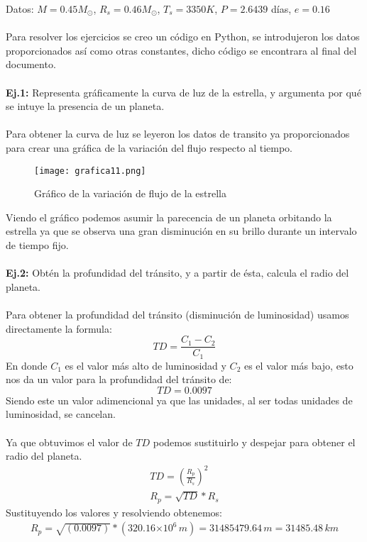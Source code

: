 \documentclass[12pt,letterpaper]{article}
\newcommand\tenpow[1]{\ensuremath{{\times}10^{#1}}}
\begin{document}
Datos: $M=0.45$\(M_\odot\), $R_s=0.46$\(M_\odot\), $T_s=3350K$, $P=2.6439$ días, $e=0.16$\\\\
Para resolver los ejercicios se creo un código en Python, se introdujeron los datos proporcionados así como otras constantes, dicho código se encontrara al final del documento.\\\\
\textbf{Ej.1:} Representa gráficamente la curva de luz de la estrella, y argumenta 
por qué se intuye la presencia de un planeta.\\\\
Para obtener la curva de luz se leyeron los datos de transito ya proporcionados para crear una gráfica de la variación del flujo respecto al tiempo.
\begin{figure}[H]
\centering
\texttt{[image: grafica11.png]}
\caption{Gráfico de la variación de flujo de la estrella}
\end{figure} 
Viendo el gráfico podemos asumir la parecencia de un planeta orbitando la estrella ya que se observa una gran disminución en su brillo durante un intervalo de tiempo fijo.\\\\
\textbf{Ej.2:} Obtén la profundidad del tránsito, y a partir de ésta, calcula el radio del planeta.\\\\
Para obtener la profundidad del tránsito (disminución de luminosidad) usamos directamente la formula:
\begin{equation}
TD=\frac{C_1-C_2}{C_1}
\end{equation}
En donde $C_1$ es el valor más alto de luminosidad y $C_2$ es el valor más bajo, esto nos da un valor para la profundidad del tránsito de:
\begin{equation}
TD=0.0097
\end{equation}
Siendo este un valor adimencional ya que las unidades, al ser todas unidades de luminosidad, se cancelan.\\\\
Ya que obtuvimos el valor de $TD$ podemos sustituirlo y despejar para obtener el radio del planeta.
\begin{gather}
TD=\left(\frac{R_p}{R_s}\right)^2\\
R_p=\sqrt{TD}*R_s
\end{gather}
Sustituyendo los valores y resolviendo obtenemos:
\begin{gather}
R_p=\sqrt{(0.0097)}*(320.16\tenpow{6}\,m)=31485479.64\,m=31485.48\,km
\end{gather}
\end{document}
